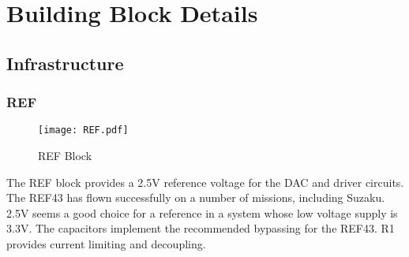 \documentclass[a4paper,12pt]{article}
\begin{document}









\section{Building Block Details}
\subsection{Infrastructure}
\subsubsection{REF}
   \begin{figure}
   \begin{center}
   \texttt{[image: REF.pdf]}
   \end{center}
   \caption{REF Block}
   \end{figure}

The REF block provides a 2.5V reference voltage for the DAC and driver circuits. The REF43 has flown successfully on a number of missions, including Suzaku. 2.5V seems a good choice for a reference in a system whose low voltage supply is 3.3V. The capacitors implement the recommended bypassing for the REF43.
R1 provides current limiting and decoupling.

\end{document}
